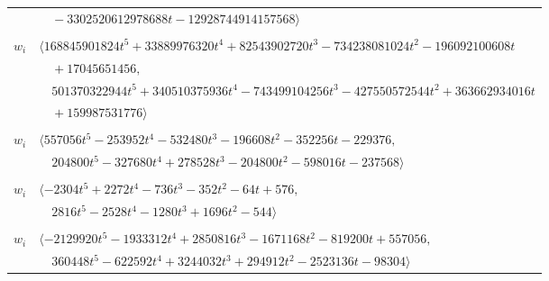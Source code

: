 \documentclass[11pt]{article}
\begin{document}
\begin{longtable}{@{}ll@{}}
 & $\quad -3302520612978688t-12928744914157568\rangle$\\
\addlinespace[2pt]
\multicolumn{2}{@{}p{0.97\textwidth}@{}}{$i=11$, $D_i=16777216$, $\rho_{ij}$: $1{:}2, \allowbreak 2{:}2, \allowbreak 3{:}1, \allowbreak 10{:}2, \allowbreak 33{:}1, \allowbreak 38{:}2, \allowbreak 43{:}1, \allowbreak 48{:}1, \allowbreak 49{:}2, \allowbreak 52{:}1, \allowbreak 55{:}2, \allowbreak 57{:}2, \allowbreak 58{:}2, \allowbreak 69{:}2, \allowbreak 73{:}1, \allowbreak 75{:}1$}\\
$w_i$ & $\langle 168845901824t^{5}+33889976320t^{4}+82543902720t^{3}-734238081024t^{2}-196092100608t$\\
 & $\quad +17045651456,$\\
 & $\quad 501370322944t^{5}+340510375936t^{4}-743499104256t^{3}-427550572544t^{2}+363662934016t$\\
 & $\quad +159987531776\rangle$\\
\addlinespace[2pt]
\multicolumn{2}{@{}p{0.97\textwidth}@{}}{$i=12$, $D_i=8192$, $\rho_{ij}$: $7{:}2, \allowbreak 10{:}2, \allowbreak 28{:}1, \allowbreak 35{:}1, \allowbreak 46{:}2, \allowbreak 52{:}1, \allowbreak 63{:}2, \allowbreak 65{:}1, \allowbreak 75{:}2$}\\
$w_i$ & $\langle 557056t^{5}-253952t^{4}-532480t^{3}-196608t^{2}-352256t-229376,$\\
 & $\quad 204800t^{5}-327680t^{4}+278528t^{3}-204800t^{2}-598016t-237568\rangle$\\
\addlinespace[2pt]
\multicolumn{2}{@{}p{0.97\textwidth}@{}}{$i=13$, $D_i=32$, $\rho_{ij}$: $15{:}2, \allowbreak 16{:}1, \allowbreak 34{:}2, \allowbreak 39{:}1, \allowbreak 41{:}1, \allowbreak 45{:}2, \allowbreak 48{:}2, \allowbreak 49{:}2, \allowbreak 51{:}1, \allowbreak 60{:}1, \allowbreak 65{:}1, \allowbreak 66{:}1, \allowbreak 72{:}1$}\\
$w_i$ & $\langle -2304t^{5}+2272t^{4}-736t^{3}-352t^{2}-64t+576,$\\
 & $\quad 2816t^{5}-2528t^{4}-1280t^{3}+1696t^{2}-544\rangle$\\
\addlinespace[2pt]
\multicolumn{2}{@{}p{0.97\textwidth}@{}}{$i=14$, $D_i=32768$, $\rho_{ij}$: $6{:}2, \allowbreak 17{:}2, \allowbreak 19{:}2, \allowbreak 20{:}1, \allowbreak 22{:}2, \allowbreak 33{:}2, \allowbreak 58{:}2, \allowbreak 59{:}1$}\\
$w_i$ & $\langle -2129920t^{5}-1933312t^{4}+2850816t^{3}-1671168t^{2}-819200t+557056,$\\
 & $\quad 360448t^{5}-622592t^{4}+3244032t^{3}+294912t^{2}-2523136t-98304\rangle$\\

\end{longtable}
\end{document}
